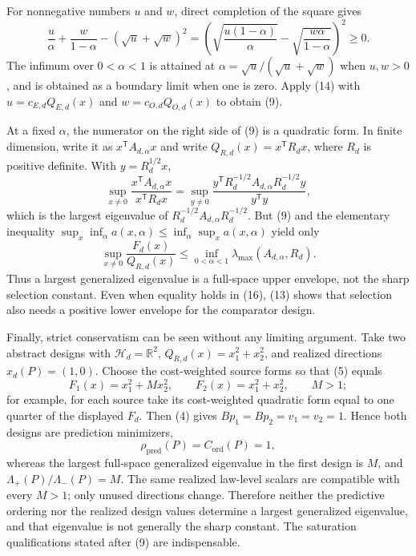 For nonnegative numbers \(u\) and \(w\), direct completion of the square gives
\[
 \frac{u}{\alpha}+\frac{w}{1-\alpha}
 -(\sqrt u+\sqrt w)^2
 =\left(
 \sqrt{\frac{u(1-\alpha)}{\alpha}}
 -\sqrt{\frac{w\alpha}{1-\alpha}}
 \right)^2\ge0.
 \tag{14}
\]
The infimum over \(0<\alpha<1\) is attained at
\(\alpha=\sqrt u/(\sqrt u+\sqrt w)\) when \(u,w>0\), and is obtained as a boundary limit when one is zero.  Apply (14) with
\(u=c_{E,d}Q_{E,d}(x)\) and
\(w=c_{O,d}Q_{O,d}(x)\) to obtain (9).

At a fixed \(\alpha\), the numerator on the right side of (9) is a quadratic form.  In finite dimension, write it as \(x^{\mathsf T}A_{d,\alpha}x\) and write \(Q_{R,d}(x)=x^{\mathsf T}R_dx\), where \(R_d\) is positive definite.  With \(y=R_d^{1/2}x\),
\[
 \sup_{x\ne0}
 \frac{x^{\mathsf T}A_{d,\alpha}x}{x^{\mathsf T}R_dx}
 =\sup_{y\ne0}
 \frac{y^{\mathsf T}R_d^{-1/2}A_{d,\alpha}R_d^{-1/2}y}{y^{\mathsf T}y},
 \tag{15}
\]
which is the largest eigenvalue of
\(R_d^{-1/2}A_{d,\alpha}R_d^{-1/2}\).  But (9) and the elementary inequality
\(\sup_x\inf_\alpha a(x,\alpha)\le\inf_\alpha\sup_x a(x,\alpha)\) yield only
\[
 \sup_{x\ne0}\frac{F_d(x)}{Q_{R,d}(x)}
 \le
 \inf_{0<\alpha<1}
 \lambda_{\max}(A_{d,\alpha},R_d).
 \tag{16}
\]
Thus a largest generalized eigenvalue is a full-space upper envelope, not the sharp selection constant.  Even when equality holds in (16), (13) shows that selection also needs a positive lower envelope for the comparator design.

Finally, strict conservatism can be seen without any limiting argument.  Take two abstract designs with \(\mathcal H_d=\mathbb R^2\), \(Q_{R,d}(x)=x_1^2+x_2^2\), and realized directions \(x_d(P)=(1,0)\).  Choose the cost-weighted source forms so that (5) equals
\[
 F_1(x)=x_1^2+Mx_2^2,
 \qquad
 F_2(x)=x_1^2+x_2^2,
 \qquad M>1;
 \tag{17}
\]
for example, for each source take its cost-weighted quadratic form equal to one quarter of the displayed \(F_d\).  Then (4) gives
\(Bp_1=Bp_2=v_1=v_2=1\).  Hence both designs are prediction minimizers,
\[
 \rho_{\mathrm{pred}}(P)=C_{\mathrm{ord}}(P)=1,
\]
whereas the largest full-space generalized eigenvalue in the first design is \(M\), and \(\Lambda_+(P)/\Lambda_-(P)=M\).  The same realized law-level scalars are compatible with every \(M>1\); only unused directions change.  Therefore neither the predictive ordering nor the realized design values determine a largest generalized eigenvalue, and that eigenvalue is not generally the sharp constant.  The saturation qualifications stated after (9) are indispensable.